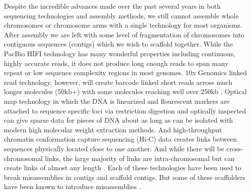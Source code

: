 \par{
Despite the incredible advances made over the past several years in both sequencing technologies and assembly methods, we still cannot assemble whole chromosomes or chromosome arms with a 
single technology for most organisms. After assembly we are left with some level of fragmentation of chromosomes into contiguous sequences (contigs) which we wish to scaffold together. While the 
PacBio HIFI technology has many wonderful properties including continuous, highly accurate reads, it does not produce long enough reads to span many repeat or low sequence complexity regions in most genomes.
 10x Genomics linked read technology, however, will create barcode linked short reads across much longer molecules (50kb+) with some molecules reaching well over 250kb \cite{10xlinked}. Optical map technology in which the DNA is linearized and flourescent markers are attached to sequence specific loci via restriction digestion and optically inspected can give sparse data for pieces of DNA about as long as can be isolated with modern high molecular weight extraction methods\cite{opticalmaps1}. And high-throughput chromatin conformation capture sequencing (Hi-C) data creates links between sequences physically located close to one another. And while there will be cross-chromosomal links, the large majority of links are intra-chromosomal but can create links of almost any length \cite{3CHIC} \cite{HIC}. Each of these technologies have been used to break misassemblies in contigs and scaffold contigs\cite{scaff10x}\cite{opticalhuman}\cite{hicscafffirst}\cite{SALSA}\cite{GRAAL}\cite{instaGRAAL}. But some of these scaffolders have been known to introduce misassemblies \cite{hicscafffirst}. 
} \\


